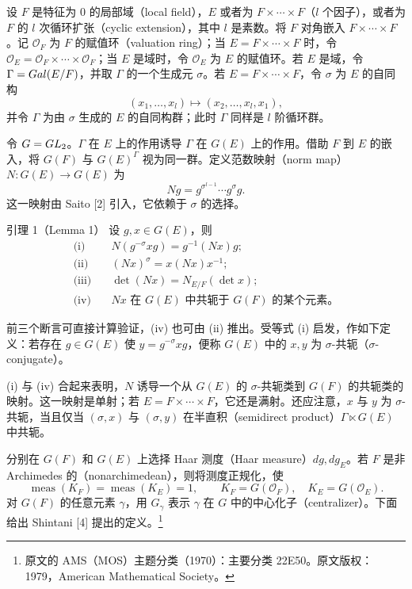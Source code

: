 
设 $F$ 是特征为 $0$ 的局部域（local field），$E$ 或者为 $F\times\cdots\times F$（$l$ 个因子），或者为 $F$ 的 $l$ 次循环扩张（cyclic extension），其中 $l$ 是素数。将 $F$ 对角嵌入 $F\times\cdots\times F$。记 $\mathcal O_F$ 为 $F$ 的赋值环（valuation ring）；当 $E=F\times\cdots\times F$ 时，令 $\mathcal O_E=\mathcal O_F\times\cdots\times\mathcal O_F$；当 $E$ 是域时，令 $\mathcal O_E$ 为 $E$ 的赋值环。若 $E$ 是域，令 $\Gamma=Gal(E/F)$，并取 $\Gamma$ 的一个生成元 $\sigma$。若 $E=F\times\cdots\times F$，令 $\sigma$ 为 $E$ 的自同构
\[
 (x_1,\ldots,x_l)\longmapsto(x_2,\ldots,x_l,x_1),
\]
并令 $\Gamma$ 为由 $\sigma$ 生成的 $E$ 的自同构群；此时 $\Gamma$ 同样是 $l$ 阶循环群。

令 $G=GL_2$。$\Gamma$ 在 $E$ 上的作用诱导 $\Gamma$ 在 $G(E)$ 上的作用。借助 $F$ 到 $E$ 的嵌入，将 $G(F)$ 与 $G(E)^\Gamma$ 视为同一群。定义范数映射（norm map）$N:G(E)\to G(E)$ 为
\[
 Ng=g^{\sigma^{l-1}}\cdots g^\sigma g.
\]
这一映射由 Saito [2] 引入，它依赖于 $\sigma$ 的选择。

\begin{originaltheorem}{引理 1（Lemma 1）}
设 $g,x\in G(E)$，则
\begin{align*}
\text{(i)}\quad &N(g^{-\sigma}xg)=g^{-1}(Nx)g;\\
\text{(ii)}\quad &(Nx)^\sigma=x(Nx)x^{-1};\\
\text{(iii)}\quad &\det(Nx)=N_{E/F}(\det x);\\
\text{(iv)}\quad &Nx\text{ 在 }G(E)\text{ 中共轭于 }G(F)\text{ 的某个元素。}
\end{align*}
\end{originaltheorem}

前三个断言可直接计算验证，(iv) 也可由 (ii) 推出。受等式 (i) 启发，作如下定义：若存在 $g\in G(E)$ 使 $y=g^{-\sigma}xg$，便称 $G(E)$ 中的 $x,y$ 为 $\sigma$-共轭（$\sigma$-conjugate）。

(i) 与 (iv) 合起来表明，$N$ 诱导一个从 $G(E)$ 的 $\sigma$-共轭类到 $G(F)$ 的共轭类的映射。这一映射是单射；若 $E=F\times\cdots\times F$，它还是满射。还应注意，$x$ 与 $y$ 为 $\sigma$-共轭，当且仅当 $(\sigma,x)$ 与 $(\sigma,y)$ 在半直积（semidirect product）$\Gamma\ltimes G(E)$ 中共轭。

分别在 $G(F)$ 和 $G(E)$ 上选择 Haar 测度（Haar measure）$dg,dg_E$。若 $F$ 是非 Archimedes 的（nonarchimedean），则将测度正规化，使
\[
 \operatorname{meas}(K_F)=\operatorname{meas}(K_E)=1,
 \qquad K_F=G(\mathcal O_F),\quad K_E=G(\mathcal O_E).
\]
对 $G(F)$ 的任意元素 $\gamma$，用 $G_\gamma$ 表示 $\gamma$ 在 $G$ 中的中心化子（centralizer）。下面给出 Shintani [4] 提出的定义。\footnote{原文的 AMS（MOS）主题分类（1970）：主要分类 22E50。原文版权：1979，American Mathematical Society。}

